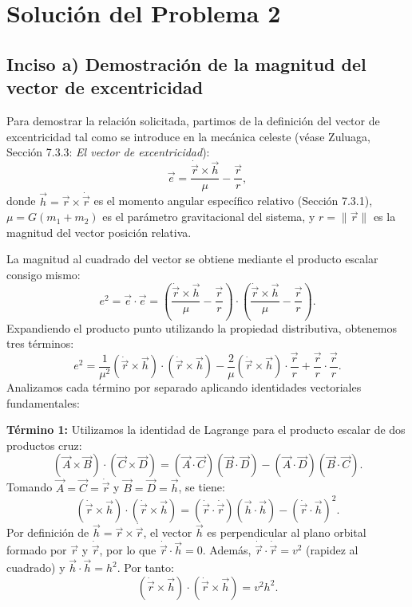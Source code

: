 \documentclass[12pt, a4paper]{article}
\begin{document}
\section*{Solución del Problema 2}

\subsection*{Inciso a) Demostración de la magnitud del vector de excentricidad}

Para demostrar la relación solicitada, partimos de la definición del vector de excentricidad tal como se introduce en la mecánica celeste (véase Zuluaga, Sección 7.3.3: \textit{El vector de excentricidad}):
$$
\vec{e} = \frac{\dot{\vec{r}} \times \vec{h}}{\mu} - \frac{\vec{r}}{r},
$$
donde $\vec{h} = \vec{r} \times \dot{\vec{r}}$ es el momento angular específico relativo (Sección 7.3.1), $\mu = G(m_1 + m_2)$ es el parámetro gravitacional del sistema, y $r = \|\vec{r}\|$ es la magnitud del vector posición relativa.

La magnitud al cuadrado del vector se obtiene mediante el producto escalar consigo mismo:
$$
e^2 = \vec{e} \cdot \vec{e} = \left( \frac{\dot{\vec{r}} \times \vec{h}}{\mu} - \frac{\vec{r}}{r} \right) \cdot \left( \frac{\dot{\vec{r}} \times \vec{h}}{\mu} - \frac{\vec{r}}{r} \right).
$$
Expandiendo el producto punto utilizando la propiedad distributiva, obtenemos tres términos:
$$
e^2 = \frac{1}{\mu^2} (\dot{\vec{r}} \times \vec{h}) \cdot (\dot{\vec{r}} \times \vec{h}) - \frac{2}{\mu} (\dot{\vec{r}} \times \vec{h}) \cdot \frac{\vec{r}}{r} + \frac{\vec{r}}{r} \cdot \frac{\vec{r}}{r}.
$$
Analizamos cada término por separado aplicando identidades vectoriales fundamentales:

\textbf{Término 1:} Utilizamos la identidad de Lagrange para el producto escalar de dos productos cruz:
$$
(\vec{A} \times \vec{B}) \cdot (\vec{C} \times \vec{D}) = (\vec{A} \cdot \vec{C})(\vec{B} \cdot \vec{D}) - (\vec{A} \cdot \vec{D})(\vec{B} \cdot \vec{C}).
$$
Tomando $\vec{A} = \vec{C} = \dot{\vec{r}}$ y $\vec{B} = \vec{D} = \vec{h}$, se tiene:
$$
(\dot{\vec{r}} \times \vec{h}) \cdot (\dot{\vec{r}} \times \vec{h}) = (\dot{\vec{r}} \cdot \dot{\vec{r}})(\vec{h} \cdot \vec{h}) - (\dot{\vec{r}} \cdot \vec{h})^2.
$$
Por definición de $\vec{h} = \vec{r} \times \dot{\vec{r}}$, el vector $\vec{h}$ es perpendicular al plano orbital formado por $\vec{r}$ y $\dot{\vec{r}}$, por lo que $\dot{\vec{r}} \cdot \vec{h} = 0$. Además, $\dot{\vec{r}} \cdot \dot{\vec{r}} = v^2$ (rapidez al cuadrado) y $\vec{h} \cdot \vec{h} = h^2$. Por tanto:
$$
(\dot{\vec{r}} \times \vec{h}) \cdot (\dot{\vec{r}} \times \vec{h}) = v^2 h^2.
$$
\end{document}
